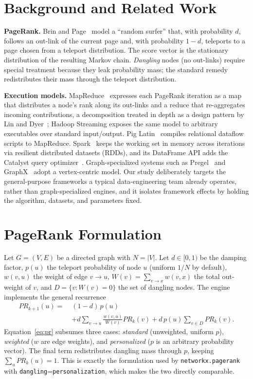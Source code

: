 \section{Background and Related Work}
\label{sec:background}
\textbf{PageRank.} Brin and Page~\cite{brin1998,page1999} model a ``random
surfer'' that, with probability $d$, follows an out-link of the current page and,
with probability $1-d$, teleports to a page chosen from a teleport distribution.
The score vector is the stationary distribution of the resulting Markov chain.
\emph{Dangling} nodes (no out-links) require special treatment because they leak
probability mass; the standard remedy redistributes their mass through the
teleport distribution.

\textbf{Execution models.} MapReduce~\cite{dean2008} expresses each PageRank
iteration as a map that distributes a node's rank along its out-links and a
reduce that re-aggregates incoming contributions, a decomposition treated in
depth as a design pattern by Lin and Dyer~\cite{lin2010}; Hadoop Streaming
exposes the same model to arbitrary executables over standard input/output. Pig
Latin~\cite{olston2008} compiles relational dataflow scripts to MapReduce.
Spark~\cite{zaharia2012} keeps the working set in memory across iterations via
resilient distributed datasets (RDDs), and its DataFrame API adds the Catalyst
query optimizer~\cite{armbrust2015}. Graph-specialized systems such as
Pregel~\cite{malewicz2010} and GraphX~\cite{gonzalez2014} adopt a
vertex-centric model. Our study deliberately targets the general-purpose
frameworks a typical data-engineering team already operates, rather than
graph-specialized engines, and it isolates framework effects by holding the
algorithm, datasets, and parameters fixed.

\section{PageRank Formulation}
\label{sec:formulation}
Let $G=(V,E)$ be a directed graph with $N=|V|$. Let $d\in[0,1)$ be the damping
factor, $p(u)$ the teleport probability of node $u$ (uniform $1/N$ by default),
$w(v,u)$ the weight of edge $v\!\to\!u$, $W(v)=\sum_{v\to x} w(v,x)$ the total
out-weight of $v$, and $D=\{v: W(v)=0\}$ the set of dangling nodes. The engine
implements the general recurrence
\begin{equation}
\label{eq:pr}
\begin{aligned}
PR_{k+1}(u) =\;& (1-d)\,p(u) \\
            &+ d\!\!\sum_{v\to u}\!\frac{w(v,u)}{W(v)}PR_k(v)
             + d\,p(u)\!\!\sum_{v\in D}\!PR_k(v).
\end{aligned}
\end{equation}
Equation~\eqref{eq:pr} subsumes three cases: \emph{standard} (unweighted,
uniform $p$), \emph{weighted} ($w$ are edge weights), and \emph{personalized}
($p$ is an arbitrary probability vector). The final term redistributes dangling
mass through $p$, keeping $\sum_u PR_k(u)=1$. This is exactly the formulation
used by \texttt{networkx.pagerank} with \texttt{dangling}=\texttt{personalization},
which makes the two directly comparable.

